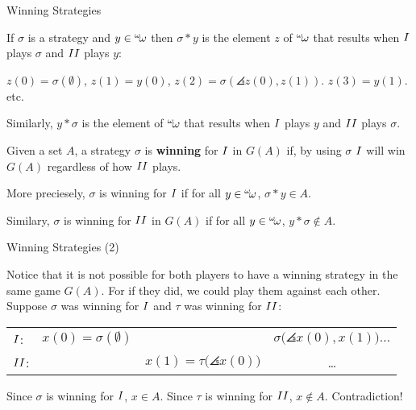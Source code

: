 \documentclass[pdf,final]{prosper}
\newcommand{\skipsmall}{\vspace{1em}}
\begin{document}
\begin{slide}{Winning Strategies}

\begin{definition}
If $\sigma$ is a strategy and $y\in{}^{\omega}\!{\omega}$ then $\sigma*y$ is the element $z$
of ${}^{\omega}\!{\omega}$ that results when $I$ plays $\sigma$ and $II$ plays $y$:

\skipsmall

$z(0)=\sigma(\emptyset)$, $z(1)=y(0)$,  $z(2)=\sigma(\angles{z(0),z(1)})$.
$z(3)=y(1)$. etc. 

\skipsmall

Similarly, $y*\sigma$ is the element
of ${}^{\omega}\!{\omega}$ that results when $I$ plays $y$ and $II$ plays
$\sigma$.

\end{definition}

\skipsmall

\begin{definition}
Given a set $A$, a strategy $\sigma$ is \textbf{winning} for $I$ in $G(A)$
if, by using $\sigma$ $I$ will win $G(A)$ regardless of how $II$ plays. 

\skipsmall
More preciesely, $\sigma$ is winning for $I$ if for
all $y\in{}^{\omega}\!{\omega}$, $\sigma*y\in A$.

\skipsmall

Similary, $\sigma$ is winning for $II$ in $G(A)$ if for all $y\in{}^{\omega}\!{\omega}$,
$y*\sigma\notin A$.
\end{definition}

\end{slide}

\begin{slide}{Winning Strategies (2)}

Notice that it is not possible for both players to have a winning strategy in
the same game $G(A)$. For if they did, we could play them against each other.
Suppose $\sigma$ was winning for $I$ and $\tau$ was winning for $II$:

\skipsmall

\begin{tabular}{lccc}
$I$: & $x(0)=\sigma(\emptyset)$ & & $\sigma\bigl(\angles{x(0),x(1)}\bigr)\dots$\\
$II$: & & $x(1)=\tau\bigl(\angles{x(0)}\bigr)$ &\dots
\end{tabular}

\skipsmall

Since $\sigma$ is winning for $I$, $x\in A$. Since $\tau$ is winning for
$II$, $x\notin A$. Contradiction!

\end{slide}
\end{document}
